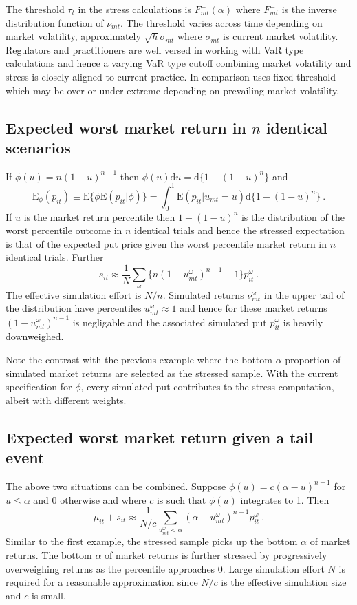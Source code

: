\documentclass[authoryear]{elsarticle}
\newcommand{\E}{\mathrm{E}}
\renewcommand{\o}{\omega}
\newcommand{\Es}{\E_\phi}
\newcommand{\de}{\mathrm{d}}
\begin{document}
The threshold $\tau_t$ in the stress calculations is $F_{mt}^-(\alpha)$ where $F_{mt}^-$ is the inverse distribution function of $\nu_{mt}$. The threshold varies across time depending on market volatility, approximately $\sqrt{h}\sigma_{mt}$ where $\sigma_{mt}$ is current market volatility.   Regulators and practitioners  are well versed in working with VaR type calculations and hence a varying VaR type cutoff combining market volatility and stress is closely aligned to current practice. In comparison \cite{brownlees2015} uses fixed threshold which may be over or under extreme depending on prevailing market volatility.


\subsection{Expected worst market return in $n$ identical scenarios}

If $\phi(u)=n(1-u)^{n-1}$ then $\phi(u)\de u = \de\{1-(1-u)^n\}$ and
$$
\Es(p_{it}) \equiv \E\{\phi\E(p_{it}|\phi)\} = \int_0^1\E(p_{it}|u_{mt}=u)\de\{1-(1-u)^n\}\ .
$$
If $u$ is the market return percentile then  $1-(1-u)^n$ is the distribution of the worst percentile outcome in $n$ identical trials and hence the stressed expectation is that of the expected put price given the worst percentile market return in $n$ identical trials.  Further
$$
s_{it}  \approx  \frac{1}{N} \sum_\o \{ n(1-u^\o_{mt})^{n-1}-1\}p_{it}^\o \ .
$$
The effective simulation effort is $N/n$.
Simulated returns $\nu^\o_{mt}$ in the upper tail of the distribution  have percentiles $u^\o_{mt}\approx 1$ and hence for these market returns $(1-u^\o_{mt})^{n-1}$ is negligable and the associated simulated put $p_{it}^\omega$ is heavily downweighed.

Note the contrast with the previous example where the bottom $\alpha$ proportion of simulated market returns are selected as the stressed sample. With the current specification for $\phi$,   every simulated put contributes to the stress computation, albeit with  different weights.


\subsection{Expected worst market return given a tail event}

The above two situations can be combined.   Suppose  $\phi(u)=c(\alpha-u)^{n-1}$ for $u\le \alpha$ and 0 otherwise and where $c$ is such that $\phi(u)$ integrates to 1. Then
$$
\mu_{it}+s_{it} \approx \frac{1}{N/c}\sum_{u^\o_{mt}<\alpha}  \left(\alpha-u^\o_{mt}\right)^{n-1}p_{it}^\o\ .
$$
Similar to the first example, the stressed sample picks up the bottom $\alpha$ of market returns. The bottom $\alpha$ of market returns is further stressed by  progressively overweighing returns as the percentile approaches 0.   Large simulation effort $N$ is required for a reasonable approximation since $N/c$ is the effective simulation size and $c$ is small.
\end{document}
